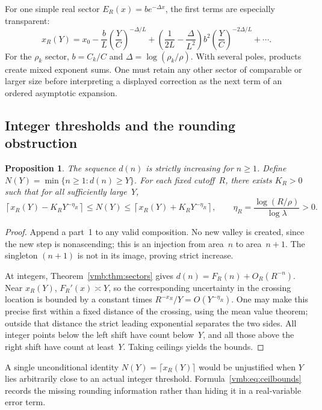 \documentclass[11pt,a4paper]{article}
\numberwithin{equation}{section}
\newtheorem{proposition}[theorem]{Proposition}
\theoremstyle{definition}\newtheorem{definition}[theorem]{Definition}
\theoremstyle{remark}\newtheorem{remark}[theorem]{Remark}
\begin{document}
For one simple real sector \(E_R(x)=b e^{-\Delta x}\), the first terms
are especially transparent:
\begin{equation}\label{vmb:eq:singleinverse}
x_R(Y)=x_0-\frac bL\left(\frac YC\right)^{-\Delta/L}
 +\left(\frac1{2L}-\frac\Delta{L^2}\right)b^2
   \left(\frac YC\right)^{-2\Delta/L}+\cdots.
\end{equation}
For the \(\rho_k\) sector, \(b=C_k/C\) and
\(\Delta=\log(\rho_k/\rho)\). With several poles, products create
mixed exponent sums. One must retain any other sector of comparable or
larger size before interpreting a displayed correction as the next term
of an ordered asymptotic expansion.

\subsection{Integer thresholds and the rounding obstruction}
\begin{proposition}\label{vmb:prop:threshold}
The sequence \(d(n)\) is strictly increasing for \(n\geq1\). Define
\(N(Y)=\min\{n\geq1:d(n)\geq Y\}\). For each fixed cutoff~\(R\),
there exists \(K_R>0\) such that for all sufficiently large~\(Y\),
\begin{equation}\label{vmb:eq:ceilbounds}
\left\lceil x_R(Y)-K_RY^{-\eta_R}\right\rceil
\leq N(Y)\leq
\left\lceil x_R(Y)+K_RY^{-\eta_R}\right\rceil,
\qquad
\eta_R=\frac{\log(R/\rho)}{\log\lambda}>0.
\end{equation}
\end{proposition}
\begin{proof}
Append a part~1 to any valid composition. No new valley is created,
since the new step is nonascending; this is an injection from area~\(n\)
to area~\(n+1\). The singleton \((n+1)\) is not in its image, proving
strict increase.

At integers, Theorem~\ref{vmb:thm:sectors} gives
\(d(n)=F_R(n)+O_R(R^{-n})\). Near \(x_R(Y)\),
\(F_R'(x)\asymp Y\), so the corresponding uncertainty in the crossing
location is bounded by a constant times
\(R^{-x_R}/Y=O(Y^{-\eta_R})\).
One may make this precise first within a fixed distance of the crossing,
using the mean value theorem; outside that distance the strict leading
exponential separates the two sides. All integer points below the left
shift have count below~\(Y\), and all those above the right shift have
count at least~\(Y\). Taking ceilings yields the bounds.
\end{proof}

A single unconditional identity \(N(Y)=\lceil x_R(Y)\rceil\) would be
unjustified when \(Y\) lies arbitrarily close to an actual integer
threshold. Formula~\eqref{vmb:eq:ceilbounds} records the missing rounding
information rather than hiding it in a real-variable error term.
\end{document}
